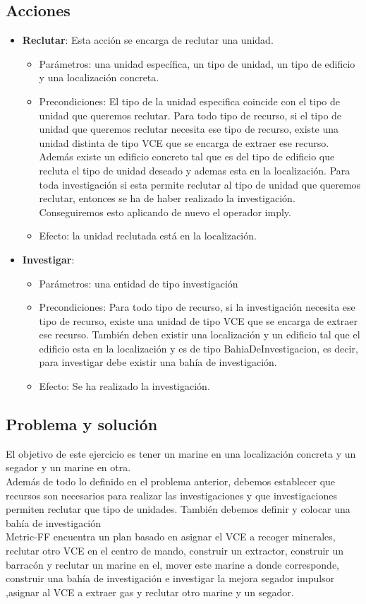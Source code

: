 \subsection{Acciones}
\begin{itemize}
   \item \textbf{Reclutar}: Esta acción se encarga de reclutar una unidad.
   \begin{itemize}
      \item Parámetros: una unidad específica, un tipo de unidad, un tipo de edificio y una localización concreta.
      \item Precondiciones: El tipo de la unidad especifica coincide con el tipo de unidad que queremos reclutar. Para todo tipo de recurso, si el tipo de unidad que queremos reclutar necesita ese tipo de recurso, existe una unidad distinta de tipo VCE que se encarga de extraer ese recurso. Además existe un edificio concreto tal que es del tipo de edificio que recluta el tipo de unidad deseado y ademas esta en la localización. Para toda investigación si esta permite reclutar al tipo de unidad que queremos reclutar, entonces se ha de haber realizado la investigación. Conseguiremos esto aplicando de nuevo el operador imply.
      \item Efecto: la unidad reclutada está en la localización.
   \end{itemize}
   \item \textbf{Investigar}:
   \begin{itemize}
      \item Parámetros: una entidad de tipo investigación
      \item Precondiciones: Para todo tipo de recurso, si la investigación necesita ese tipo de recurso, existe una unidad de tipo VCE que se encarga de extraer ese recurso. También deben existir una localización y un edificio tal que el edificio esta en la localización y es de tipo BahiaDeInvestigacion, es decir, para investigar debe existir una bahía de investigación.
      \item Efecto: Se ha realizado la investigación.
   \end{itemize}
\end{itemize}
\subsection{Problema y solución}
El objetivo de este ejercicio es tener un marine en una localización concreta y un segador y un marine en otra.\\
Además de todo lo definido en el problema anterior, debemos establecer que recursos son necesarios para realizar las investigaciones y que investigaciones permiten reclutar que tipo de unidades. También debemos definir y colocar una bahía de investigación\\
Metric-FF encuentra un plan basado en asignar el VCE a recoger minerales, reclutar otro VCE en el centro de mando, construir un extractor, construir un barracón y reclutar un marine en el, mover este marine a donde corresponde, construir una bahía de investigación e investigar la mejora segador impulsor ,asignar al VCE a extraer gas y reclutar otro marine y un segador.


